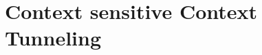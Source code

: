 \section{Context sensitive Context Tunneling}
\begin{comment}
\begin{figure}
\begin{multicols}{2}
\begin{lstlisting}
0:   Class A{} Class B{}
1:   Object id1(Object v, int i){
2:     return v;
3:   }
4:   Object id2(Object v, int i){
5:     return id1(v);
6:   }
7:  void main(){
8:    A a1 = (A)id1(new A());//Q1
9:    B b1 = (B)id1(new B());//Q2
10:   A a1 = (A)id2(new A());//Q1
11:   B b1 = (B)id2(new B());//Q2
12:   return;}
\end{lstlisting}
(a) Example Code\\
\begin{center}


\texttt{[image: figures/ctxTunnel.pdf]}\\
(c) Context-sensitive tunneling
\end{center}
\end{multicols}
\caption{Tunneling considering context}
\label{fig:ExampleCode}
\end{figure} 
\end{comment}
